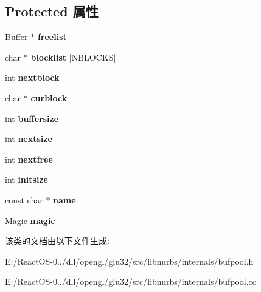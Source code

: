 \subsection*{Protected 属性}
\begin{DoxyCompactItemize}
\item 
\mbox{\label{class_pool_a742274f0f31566d43bb53339571b7001}} 
\hyperlink{class_buffer}{Buffer} $\ast$ {\bfseries freelist}
\item 
\mbox{\label{class_pool_a6d33c2b57d3be18ba5748ba63261869f}} 
char $\ast$ {\bfseries blocklist} \mbox{[}N\+B\+L\+O\+C\+KS\mbox{]}
\item 
\mbox{\label{class_pool_ad3d466568d26e449d10fa51f7d102138}} 
int {\bfseries nextblock}
\item 
\mbox{\label{class_pool_abbfb0fd6c607c7b3c93da2c815f6bcce}} 
char $\ast$ {\bfseries curblock}
\item 
\mbox{\label{class_pool_a8010c40b5954ffe4588e01dc40181201}} 
int {\bfseries buffersize}
\item 
\mbox{\label{class_pool_a97cb360b86c01bc172265143a862c1ed}} 
int {\bfseries nextsize}
\item 
\mbox{\label{class_pool_a2c696e387366eb2c964cdebecb65ef72}} 
int {\bfseries nextfree}
\item 
\mbox{\label{class_pool_a6e2c6f05d09f0867d145ed784869682b}} 
int {\bfseries initsize}
\item 
\mbox{\label{class_pool_a296b8f7ed3d0ae1ccf2a8b7b6b84e1e7}} 
const char $\ast$ {\bfseries name}
\item 
\mbox{\label{class_pool_a9338ad73597d37372f3288528095d968}} 
Magic {\bfseries magic}
\end{DoxyCompactItemize}


该类的文档由以下文件生成\+:\begin{DoxyCompactItemize}
\item 
E\+:/\+React\+O\+S-\/0../dll/opengl/glu32/src/libnurbs/internals/bufpool.\+h\item 
E\+:/\+React\+O\+S-\/0../dll/opengl/glu32/src/libnurbs/internals/bufpool.\+cc\end{DoxyCompactItemize}
